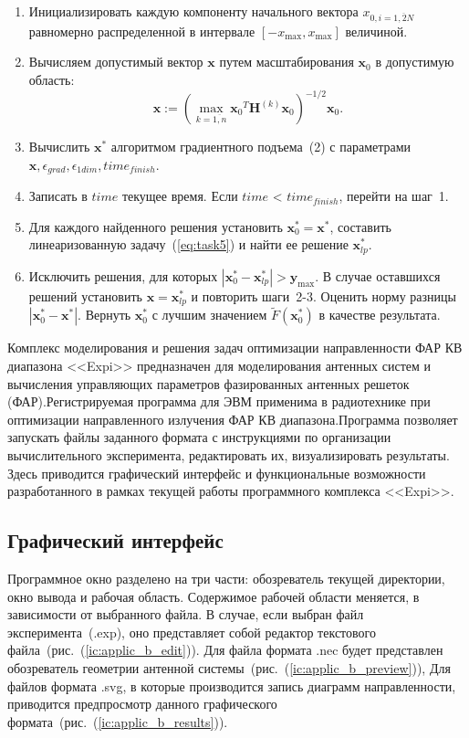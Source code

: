 \begin{enumerate}
  \item Инициализировать каждую компоненту начального вектора $x_{0,i = \overline{1,2N}}$ равномерно распределенной в интервале $[-x_{\max}, x_{\max}]$
  величиной.
  \item Вычисляем допустимый вектор $\textbf{x}$ путем масштабирования $\textbf{x}_0$ в допустимую область:
  $$\textbf{x} := (\max_{k=\overline{1,n}} {\textbf{x}_0}^T \textbf{H}^{(k)}{\textbf{x}_0})^{-1/2} {\textbf{x}_0}.$$
  \item Вычислить ${\textbf{x}^{*}}$ алгоритмом градиентного подъема~(2) с параметрами ${\textbf{x}}, \epsilon_{grad}, \epsilon_{1dim}, time_{finish}.$
  \item Записать в $time$ текущее время. Если $time$ < $time_{finish}$, перейти на шаг~1.
  \item Для каждого найденного решения установить ${\textbf{x}_0^{*}} = {\textbf{x}^{*}}$, составить линеаризованную задачу~(\ref{eq:task5}) и найти
  ее решение ${\textbf{x}_{lp}^{*}}$.
  \item Исключить решения, для которых $|{\textbf{x}_0^{*}} - {\textbf{x}_{lp}^{*}}| > {\textbf{y}_{\max}}$. В случае оставшихся решений установить
  $\textbf{x} = {\textbf{x}_{lp}^{*}}$ и повторить шаги~2-3. Оценить норму разницы $|{\textbf{x}_0^{*}} - {\textbf{x}^{*}}|$. Вернуть ${\textbf{x}_0^{*}}$ с
  лучшим значением $\tilde{F}({\textbf{x}_0^{*}})$ в качестве результата.
\end{enumerate}

\label{sec:applic_b}
Комплекс моделирования и решения задач оптимизации направленности ФАР КВ диапазона <<Expi>> предназначен для моделирования антенных систем и вычисления управляющих параметров фазированных антенных решеток (ФАР).Регистрируемая программа для ЭВМ применима в радиотехнике
при оптимизации направленного излучения ФАР КВ диапазона.Программа позволяет запускать файлы заданного формата с инструкциями по организации вычислительного эксперимента, редактировать их, визуализировать результаты.
Здесь приводится графический интерфейс и функциональные возможности разработанного в рамках текущей работы программного комплекса <<Expi>>.

\subsection*{Графический интерфейс}
  Программное окно разделено на три части: обозреватель текущей директории, окно вывода и рабочая область. Содержимое рабочей области меняется, в зависимости от выбранного файла. В случае, если выбран файл эксперимента~(.exp), оно представляет собой редактор текстового файла~(рис.~(\ref{ic:applic_b_edit})). Для файла формата .nec будет представлен обозреватель геометрии антенной системы~(рис.~(\ref{ic:applic_b_preview})), Для файлов формата .svg, в которые производится запись диаграмм направленности, приводится предпросмотр данного графического формата~(рис.~(\ref{ic:applic_b_results})).

